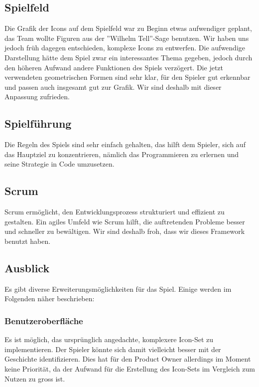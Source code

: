 \documentclass[11pt,a4paper,titlepage]{article}
\begin{document}
\subsection{Spielfeld}

Die Grafik der Icons auf dem Spielfeld war zu Beginn etwas aufwendiger geplant, das Team wollte Figuren aus der ''Wilhelm Tell''-Sage benutzen. Wir haben uns jedoch früh dagegen entschieden, komplexe Icons zu entwerfen. Die aufwendige Darstellung hätte dem Spiel zwar ein interessantes Thema gegeben, jedoch durch den höheren Aufwand andere Funktionen des Spiels verzögert. Die jetzt verwendeten geometrischen Formen sind sehr klar, für den Spieler gut erkennbar und passen auch insgesamt gut zur Grafik. Wir sind deshalb mit dieser Anpassung zufrieden.

\subsection{Spielführung}

Die Regeln des Spiels sind sehr einfach gehalten, das hilft dem Spieler, sich auf das Hauptziel zu konzentrieren, nämlich das Programmieren zu erlernen und seine Strategie in Code umzusetzen.

\subsection{Scrum}
Scrum ermöglicht, den Entwicklungsprozess strukturiert und effizient zu gestalten. Ein agiles Umfeld wie Scrum hilft, die auftretenden Probleme besser und schneller zu bewältigen. Wir sind deshalb froh, dass wir dieses Framework benutzt haben.

\subsection{Ausblick}

Es gibt diverse Erweiterungsmöglichkeiten für das Spiel. Einige werden im Folgenden näher beschrieben:

\subsubsection{Benutzeroberfläche}
Es ist möglich, das ursprünglich angedachte, komplexere Icon-Set zu implementieren. Der Spieler könnte sich damit vielleicht besser mit der Geschichte identifizieren. Dies hat für den Product Owner allerdings im Moment keine Priorität, da der Aufwand für die Erstellung des Icon-Sets im Vergleich zum Nutzen zu gross ist.
\end{document}
